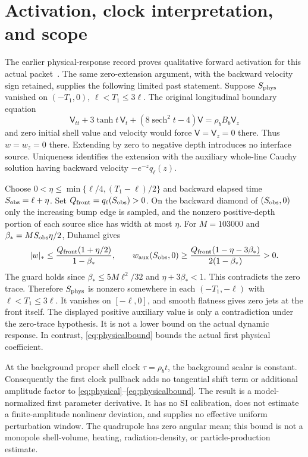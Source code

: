 \documentclass[11pt]{article}
\begin{document}
\section{Activation, clock interpretation, and scope}
The earlier physical-response record proves qualitative forward activation
for this actual packet~\cite{response}. The same zero-extension argument,
with the backward velocity sign retained, supplies the following limited
past statement. Suppose $S_{\rm phys}$ vanished on $(-T_1,0)$,
$\ell<T_1\le3\ell$. The original longitudinal boundary equation
\[
 \mathsf V_{tt}+3\tanh t\,\mathsf V_t
       +(8\operatorname{sech}^2t-4)\mathsf V
          =\rho_bB_b\mathsf V_z
\]
and zero initial shell value and velocity would force
$\mathsf V=\mathsf V_z=0$ there. Thus $w=w_z=0$ there.
Extending by zero to negative depth introduces no interface source.
Uniqueness identifies the extension with the auxiliary whole-line
Cauchy solution having backward velocity $-e^{-z}q_\ell(z)$.

Choose $0<\eta\le\min\{\ell/4,(T_1-\ell)/2\}$ and backward elapsed
time $S_{\rm obs}=\ell+\eta$.
Set $Q_{\rm front}=q_\ell(S_{\rm obs})>0$.
On the backward diamond of $(S_{\rm obs},0)$ only the increasing bump
edge is sampled, and the nonzero positive-depth portion of each source
slice has width at most $\eta$.
For $M=103000$ and $\beta_*=MS_{\rm obs}\eta/2$, Duhamel gives
\begin{equation}
 |w|_*\le\frac{Q_{\rm front}(1+\eta/2)}{1-\beta_*},\qquad
 w_{\rm aux}(S_{\rm obs},0)\ge
       \frac{Q_{\rm front}(1-\eta-3\beta_*)}{2(1-\beta_*)}>0.
\end{equation}
The guard holds since $\beta_*\le5M\ell^2/32$ and
$\eta+3\beta_*<1$. This contradicts the zero trace.
Therefore $S_{\rm phys}$ is nonzero somewhere in each
$(-T_1,-\ell)$ with $\ell<T_1\le3\ell$. It vanishes on $[-\ell,0]$,
and smooth flatness gives zero jets at the front itself.
The displayed positive auxiliary value is only a contradiction under the
zero-trace hypothesis. It is not a lower bound on the actual dynamic
response. In contrast, \eqref{eq:physicalbound} bounds the actual first
physical coefficient.

At the background proper shell clock $\tau=\rho_b t$, the background scalar
is constant. Consequently the first clock pullback adds no tangential
shift term or additional amplitude factor to
\eqref{eq:physical}--\eqref{eq:physicalbound}.
The result is a model-normalized first parameter derivative. It has no
SI calibration, does not estimate a finite-amplitude nonlinear deviation,
and supplies no effective uniform perturbation window.
The quadrupole has zero angular mean; this bound is not a monopole
shell-volume, heating, radiation-density, or particle-production estimate.
\end{document}
